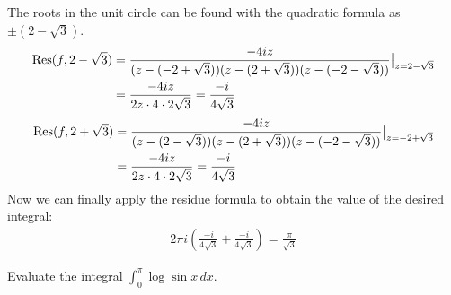 \documentclass{homework}
\begin{document}
\begin{solution}
                                                                                       The roots in the unit circle can be found with the quadratic formula as $\pm (2-\sqrt{3})$.
                                                                                       \begin{align*}
                                                                                       \operatorname{Res}(f, 2-\sqrt{3}) &= 
                                                                                       \frac{-4iz}{(z-(-2+\sqrt{3}))(z-(2+\sqrt{3}))(z-(-2-\sqrt{3}))}\big|_{z=2-\sqrt{3}}\\
                                                                                       &= \frac{-4iz}{2z\cdot 4\cdot 2\sqrt{3}} = \frac{-i}{4\sqrt{3}}
                                                                                       \end{align*}
                                                                                       \begin{align*}
                                                                                       \operatorname{Res}(f, 2+\sqrt{3}) &= 
                                                                                       \frac{-4iz}{(z-(2-\sqrt{3}))(z-(2+\sqrt{3}))(z-(-2-\sqrt{3}))}\big|_{z=-2+\sqrt{3}}\\
                                                                                       &= \frac{-4iz}{2z\cdot 4\cdot 2\sqrt{3}} = \frac{-i}{4\sqrt{3}}
                                                                                       \end{align*}
                                                                                       Now we can finally apply the residue formula to obtain the value of the desired integral:
                                                                                       \begin{align*}
                                                                                       2\pi i 
                                                                                       \left(\frac{-i}{4\sqrt{3}}+ \frac{-i}{4\sqrt{3}}\right) = \frac{\pi}{\sqrt{3}}
                                                                                       \end{align*}

                                                                                       \end{solution}
                                                                                       \begin{problem}
                                                                                         Evaluate the integral $\displaystyle \int_0^\pi \log \sin x \, dx$.
                                                                                         \end{problem}
\end{document}
